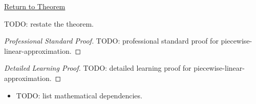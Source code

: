 \newpage
{}
\label{prf:piecewise-linear-approximation}

\begin{remark*}[Return]
\hyperref[thm:piecewise-linear-approximation]{Return to Theorem}
\end{remark*}

\begin{theorem*}
TODO: restate the theorem.
\end{theorem*}

\begin{proof}[Professional Standard Proof]
\LRAProofBodyStart
TODO: professional standard proof for piecewise-linear-approximation.
\end{proof}

\begin{proof}[Detailed Learning Proof]
\LRAProofBodyStart
TODO: detailed learning proof for piecewise-linear-approximation.
\end{proof}

\begin{remark*}
\end{remark*}

\begin{dependencies}
\begin{itemize}
  \item TODO: list mathematical dependencies.
\end{itemize}
\end{dependencies}

\clearpage
